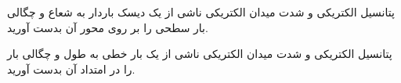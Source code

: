 \begin{ELjoin}
\begin{ELexample}{}
\begin{ELsolution}

\end{ELsolution}

\end{ELexample}

\end{ELjoin}


\begin{ELexample}{}

پتانسیل الکتریکی و شدت میدان الکتریکی ناشی از یک دیسک باردار به شعاع  و چگالی بار سطحی  را بر روی محور آن بدست آورید.


\begin{ELsolution}


\end{ELsolution}

\end{ELexample}


\begin{ELexample}{}

پتانسیل الکتریکی و شدت میدان الکتریکی ناشی از یک بار خطی به طول  و چگالی بار \ELim{\rho_\ell} را در امتداد آن بدست آورید.


\begin{ELsolution}


\end{ELsolution}

\end{ELexample}

